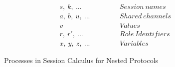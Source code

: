 \documentclass[12pt,twoside]{report}
\newcommand{\white}{\ \ \ \ \ \ \ \ \ \ \ \ }
\begin{document}
\begin{figure}[h]
\begin{equation*}
\begin{array}{rrlcr}
        &&s,\ k,\ ... & \white & Session\ names\\[2.75pt]
        &&a,\ b,\ u,\ ... & \white & Shared\ channels\\[2.75pt]
        &&v & \white & Values\\
        &&r,\ r',\ ... & \white & Role\ Identifiers\\[2.75pt]
        &&x,\ y,\ z,\ ... & \white & Variables
        \end{array}
    \end{equation*}
    \caption{Processes in Session Calculus for Nested Protocols}
    \label{nested_session_calculus}
\end{figure}{}
\end{document}
